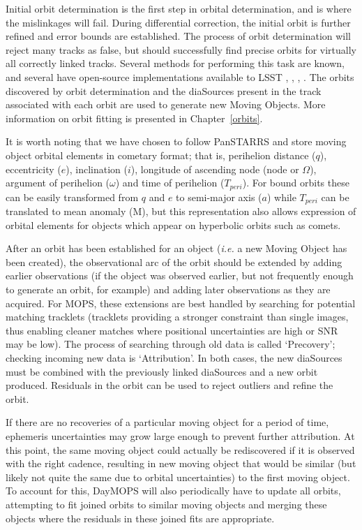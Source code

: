 Initial orbit determination is the first step in orbital determination, and is
where the mislinkages will fail. During differential correction, the
initial orbit is further refined and error bounds are established. The
process of orbit determination will reject many tracks as false, but
should successfully find precise orbits for virtually all correctly
linked tracks.  Several methods for performing this task are known,
and several have open-source implementations available to LSST
\citep{Milani04orbitdetermination}, \citep{Milani2006},
\citep{OpenOrb2009}, \citep{granvik_thesis}.  The orbits discovered by
orbit determination and the diaSources present in the track
associated with each orbit are used to generate new Moving
Objects. More information on orbit fitting is presented in Chapter~\ref{orbits}.

It is worth noting that we have chosen to follow PanSTARRS and store
moving object orbital elements in cometary format; that is, perihelion
distance ($q$), eccentricity ($e$), inclination ($i$), longitude of
ascending node (node or $\Omega$), argument of perihelion ($\omega$)
and time of perihelion ($T_{peri}$). For bound orbits these can be
easily transformed from $q$ and $e$ to semi-major axis ($a$) while 
$T_{peri}$ can be translated to mean anomaly (M), but this
representation also allows expression of orbital elements for objects
which appear on hyperbolic orbits such as comets. 

After an orbit has been established for an object ({\it i.e.} a new
Moving Object has been created), the observational arc of the orbit
should be extended by adding earlier observations (if the object was
observed earlier, but not frequently enough to generate an orbit, for
example) and adding later observations as they are acquired. For MOPS,
these extensions are best handled by searching for potential matching
tracklets (tracklets providing a stronger constraint than single
images, thus enabling cleaner matches where positional uncertainties
are high or SNR may be low). The process of searching through old data
is called `Precovery'; checking incoming new data is `Attribution'. In
both cases, the new diaSources must be combined with the previously
linked diaSources and a new orbit produced. Residuals in the orbit can
be used to reject outliers and refine the orbit. 

If there are no recoveries of a particular moving object for a period
of time, ephemeris uncertainties may grow large enough to prevent
further attribution. At this point, the same moving object could
actually be rediscovered if it is observed with the right cadence,
resulting in new moving object that would be similar (but likely
not quite the same due to orbital uncertainties) to the first moving
object. To account for this, DayMOPS will also periodically have to
update all orbits, attempting to fit joined orbits to similar moving
objects and merging these objects where the residuals in these joined
fits are appropriate. 

